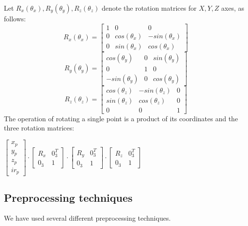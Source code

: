         Let $R_x(\theta_x), R_y(\theta_y), R_z(\theta_z)$ denote the rotation matrices
        for $X, Y, Z$ axes, as follows:
        \[
        R_x(\theta_x) =
        \begin{bmatrix}
        1 & 0 & 0\\
        0 & cos(\theta_x) & -sin(\theta_x)\\
        0 & sin(\theta_x) & cos(\theta_x)
        \end{bmatrix}
        \]
        \[
        R_y(\theta_y) =
        \begin{bmatrix}
        cos(\theta_y) & 0 & sin(\theta_y)\\
        0 & 1 & 0\\
        -sin(\theta_y) & 0 & cos(\theta_y)
        \end{bmatrix}
        \]
        \[
        R_z(\theta_z) =
        \begin{bmatrix}
        cos(\theta_z) & -sin(\theta_z) & 0\\
        sin(\theta_z) & cos(\theta_z) & 0\\
        0 & 0 & 1
        \end{bmatrix}
        \]
        The operation of rotating a single point is a product of its coordinates and the three rotation matrices:
        \begin{center}
        $
        \begin{bmatrix}
          x_p\\
          y_p\\
          z_p\\
          ir_p
        \end{bmatrix}
        \cdot
        \begin{bmatrix}
          R_x & 0_{3}^T\\
          0_{3} & 1
        \end{bmatrix}
        \cdot
        \begin{bmatrix}
          R_y & 0_{3}^T\\
          0_{3} & 1
        \end{bmatrix}
        \cdot
        \begin{bmatrix}
          R_z & 0_{3}^T\\
          0_{3} & 1
        \end{bmatrix}
        $
        \end{center}


    \subsection{Preprocessing techniques}
    We have used several different preprocessing techniques.
